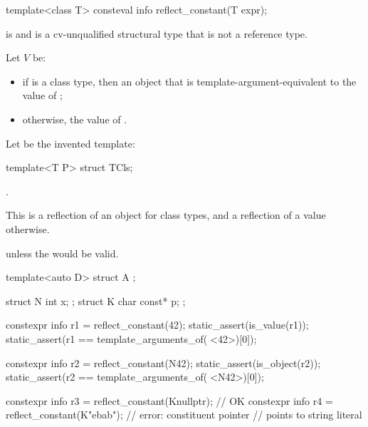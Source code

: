 %
\begin{itemdecl}
template<class T>
  consteval info reflect_constant(T expr);
\end{itemdecl}

\begin{itemdescr}
\pnum
\mandates
{} is 
and  is a cv-unqualified structural type
that is not a reference type.

\pnum
Let $V$ be:
\begin{itemize}
\item
  if  is a class type,
  then an object that is template-argument-equivalent to the value of ;
\item
  otherwise, the value of .
\end{itemize}

\pnum
Let  be the invented template:
\begin{codeblock}
template<T P> struct TCls;
\end{codeblock}

\pnum
\returns
{}.
\begin{note}
This is a reflection of an object for class types,
and a reflection of a value otherwise.
\end{note}

\pnum
\throws
{} unless
the   would be valid.

\pnum
\begin{example}
\begin{codeblock}
template<auto D>
  struct A { };

struct N { int x; };
struct K { char const* p; };

constexpr info r1 = reflect_constant(42);
static_assert(is_value(r1));
static_assert(r1 == template_arguments_of(^^A<42>)[0]);

constexpr info r2 = reflect_constant(N{42});
static_assert(is_object(r2));
static_assert(r2 == template_arguments_of(^^A<N{42}>)[0]);

constexpr info r3 = reflect_constant(K{nullptr});   // OK
constexpr info r4 = reflect_constant(K{"ebab"});    // error: constituent pointer
                                                    // points to string literal
\end{codeblock}
\end{example}
\end{itemdescr}

